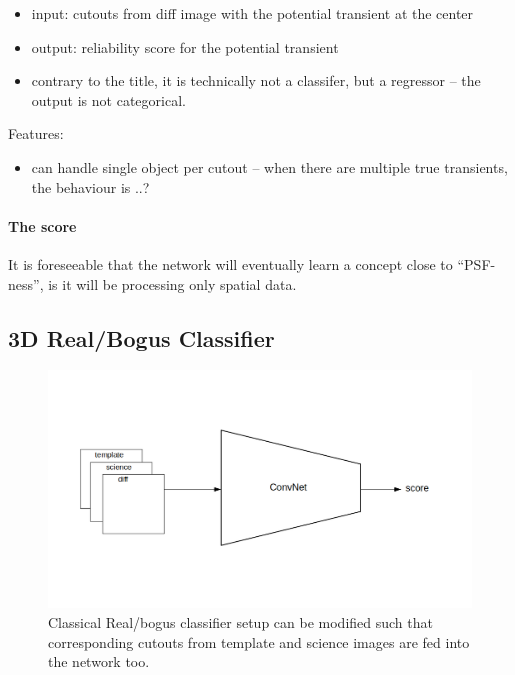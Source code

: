 \begin{itemize}
  \item input: cutouts from diff image with the potential transient at the center
  \item output: reliability score for the potential transient
  \item contrary to the title, it is technically not a classifer, but a regressor -- the output is not categorical.
\end{itemize}

Features:
\begin{itemize}
  \item can handle single object per cutout -- when there are multiple true transients, the behaviour is ..?
\end{itemize}

\paragraph{The score}
It is foreseeable that the network will eventually learn a concept close to ``PSF-ness'', is it will be processing only spatial data.


\subsection{3D Real/Bogus Classifier}
\begin{figure}[h]
  \centering
  \includegraphics[width=.8\textwidth]{material/rb-classifier-mod}
  \caption{Classical Real/bogus classifier setup can be modified such that corresponding cutouts from template and science images are fed into the network too.}
  \label{fig:rbdiagram}
\end{figure}


